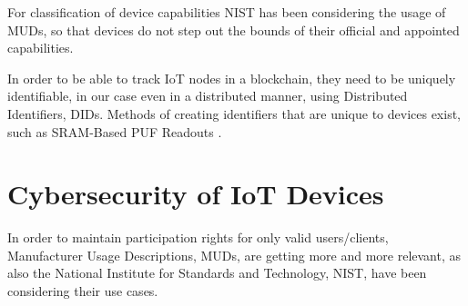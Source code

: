 For classification of device capabilities NIST has been considering the usage of MUDs, so that devices do not step out
the bounds of their official and appointed capabilities. \cite{dodson2021securing}

In order to be able to track IoT nodes in a blockchain, they need to be uniquely identifiable, in our case even in a
distributed manner, using Distributed Identifiers, DIDs. Methods of creating identifiers that are unique to devices
exist, such as SRAM-Based PUF Readouts \cite{vinagrero2023sram}.

\section{Cybersecurity of IoT Devices}

In order to maintain participation rights for only valid users/clients, Manufacturer Usage Descriptions, MUDs, are
getting more and more relevant, as also the National Institute for Standards and Technology, NIST, have been considering
their use cases. \cite{dodson2021securing}
